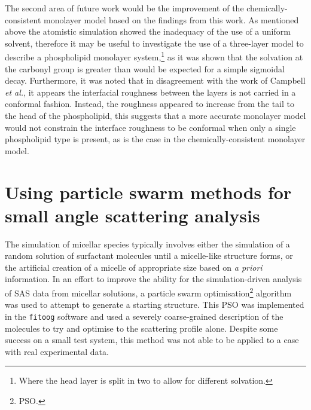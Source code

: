 The second area of future work would be the improvement of the chemically-consistent monolayer model based on the findings from this work.
As mentioned above the atomistic simulation showed the inadequacy of the use of a uniform solvent, therefore it may be useful to investigate the use of a three-layer model to describe a phospholipid monolayer system,\footnote{Where the head layer is split in two to allow for different solvation.} as it was shown that the solvation at the carbonyl group is greater than would be expected for a simple sigmoidal decay.
Furthermore, it was noted that in disagreement with the work of Campbell \emph{et al.},\autocite{campbell_structure_2018} it appears the interfacial roughness between the layers is not carried in a conformal fashion.
Instead, the roughness appeared to increase from the tail to the head of the phospholipid, this suggests that a more accurate monolayer model would not constrain the interface roughness to be conformal when only a single phospholipid type is present, as is the case in the chemically-consistent monolayer model.

\section{Using particle swarm methods for small angle scattering analysis}
The simulation of micellar species typically involves either the simulation of a random solution of surfactant molecules until a micelle-like structure forms, or the artificial creation of a micelle of appropriate size based on \emph{a priori} information.
In an effort to improve the ability for the simulation-driven analysis of SAS data from micellar solutions, a particle swarm optimisation\footnote{PSO.} algorithm was used to attempt to generate a starting structure.
This PSO was implemented in the \texttt{fitoog} software and used a severely coarse-grained description of the molecules to try and optimise to the scattering profile alone.
Despite some success on a small test system, this method was not able to be applied to a case with real experimental data.

